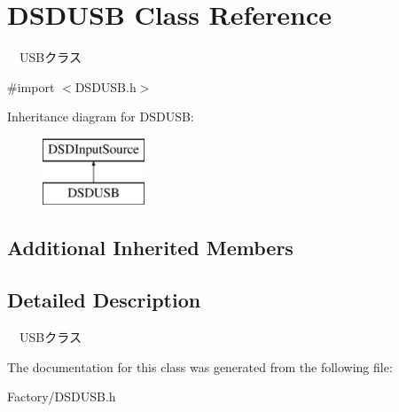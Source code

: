 \hypertarget{interface_d_s_d_u_s_b}{\section{D\-S\-D\-U\-S\-B Class Reference}
\label{interface_d_s_d_u_s_b}
}


　\-U\-S\-Bクラス  




{\ttfamily \#import $<$D\-S\-D\-U\-S\-B.\-h$>$}

Inheritance diagram for D\-S\-D\-U\-S\-B\-:\begin{figure}[H]
\begin{center}
\leavevmode
\includegraphics[height=2.000000cm]{interface_d_s_d_u_s_b}
\end{center}
\end{figure}
\subsection*{Additional Inherited Members}


\subsection{Detailed Description}
　\-U\-S\-Bクラス 

The documentation for this class was generated from the following file\-:\begin{DoxyCompactItemize}
\item 
Factory/D\-S\-D\-U\-S\-B.\-h\end{DoxyCompactItemize}
